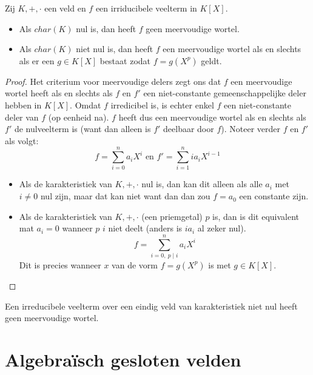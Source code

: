 \documentclass[main.tex]{subfiles}
\begin{document}
\begin{st}
  Zij $K,+,\cdot$ een veld en $f$ een irriducibele veelterm in $K[X]$.
  \begin{itemize}
  \item Als $char(K)$ nul is, dan heeft $f$ geen meervoudige wortel.
  \item Als $char(K)$ niet nul is, dan heeft $f$ een meervoudige wortel als en slechts als er een $g\in K[X]$ bestaat zodat $f=g(X^{p})$ geldt.
  \end{itemize}

  \begin{proof}
    Het criterium voor meervoudige delers zegt ons dat $f$ een meervoudige wortel heeft als en slechts als $f$ en $f'$ een niet-constante gemeenschappelijke deler hebben in $K[X]$.
    Omdat $f$ irredicibel is, is echter enkel $f$ een niet-constante deler van $f$ (op eenheid na).
    $f$ heeft dus een meervoudige wortel als en slechts als $f'$ de nulveelterm is (want dan alleen is $f'$ deelbaar door $f$).
    Noteer verder $f$ en $f'$ als volgt:
    \[ f = \sum_{i=0}^{n}a_{i}X^{i} \text{ en } f' = \sum_{i=1}^{n}ia_{i}X^{i-1} \]
    \begin{itemize}
    \item Als de karakteristiek van $K,+,\cdot$ nul is, dan kan dit alleen als alle $a_{i}$ met $i\neq 0$ nul zijn, maar dat kan niet want dan dan zou $f=a_{0}$ een constante zijn.
    \item Als de karakteristiek van $K,+,\cdot$ (een priemgetal) $p$ is, dan is dit equivalent mat $a_{i}=0$ wanneer $p$ $i$ niet deelt (anders is $ia_{i}$ al zeker nul).
      \[ f = \sum_{i=0,\ p\mid i}^{n}a_{i}X^{i} \]
      Dit is precies wanneer $x$ van de vorm $f=g(X^{p})$ is met $g\in K[X]$.
    \end{itemize}
  \end{proof}
\end{st}

\begin{st}
  Een irreducibele veelterm over een eindig veld van karakteristiek niet nul heeft geen meervoudige wortel.
  \zb
\end{st}

\section{Algebra\"isch gesloten velden}
\label{sec:algebr-gesl-veld}
\end{document}
